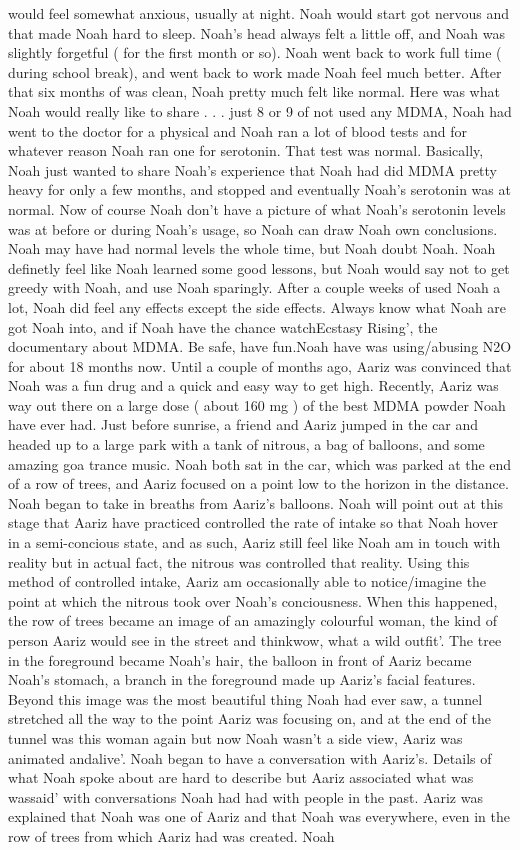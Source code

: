 \documentclass[12pt]{book}
\begin{document}
would feel somewhat anxious, usually at night. Noah would start got nervous and that made Noah hard to sleep. Noah's head always felt a little off, and Noah was slightly forgetful ( for the first month or so). Noah went back to work full time ( during school break), and went back to work made Noah feel much better. After that six months of was clean, Noah pretty much felt like normal. Here was what Noah would really like to share . . .  just 8 or 9 of not used any MDMA, Noah had went to the doctor for a physical and Noah ran a lot of blood tests and for whatever reason Noah ran one for serotonin. That test was normal. Basically, Noah just wanted to share Noah's experience that Noah had did MDMA pretty heavy for only a few months, and stopped and eventually Noah's serotonin was at normal. Now of course Noah don't have a picture of what Noah's serotonin levels was at before or during Noah's usage, so Noah can draw Noah own conclusions. Noah may have had normal levels the whole time, but Noah doubt Noah. Noah definetly feel like Noah learned some good lessons, but Noah would say not to get greedy with Noah, and use Noah sparingly. After a couple weeks of used Noah a lot, Noah did feel any effects except the side effects. Always know what Noah are got Noah into, and if Noah have the chance watchEcstasy Rising', the documentary about MDMA. Be safe, have fun.Noah have was using/abusing N2O for about 18 months now. Until a couple of months ago, Aariz was convinced that Noah was a fun drug and a quick and easy way to get high. Recently, Aariz was way out there on a large dose ( about 160 mg ) of the best MDMA powder Noah have ever had. Just before sunrise, a friend and Aariz jumped in the car and headed up to a large park with a tank of nitrous, a bag of balloons, and some amazing goa trance music. Noah both sat in the car, which was parked at the end of a row of trees, and Aariz focused on a point low to the horizon in the distance. Noah began to take in breaths from Aariz's balloons. Noah will point out at this stage that Aariz have practiced controlled the rate of intake so that Noah hover in a semi-concious state, and as such, Aariz still feel like Noah am in touch with reality but in actual fact, the nitrous was controlled that reality. Using this method of controlled intake, Aariz am occasionally able to notice/imagine the point at which the nitrous took over Noah's conciousness. When this happened, the row of trees became an image of an amazingly colourful woman, the kind of person Aariz would see in the street and thinkwow, what a wild outfit'. The tree in the foreground became Noah's hair, the balloon in front of Aariz became Noah's stomach, a branch in the foreground made up Aariz's facial features. Beyond this image was the most beautiful thing Noah had ever saw, a tunnel stretched all the way to the point Aariz was focusing on, and at the end of the tunnel was this woman again but now Noah wasn't a side view, Aariz was animated andalive'. Noah began to have a conversation with Aariz's. Details of what Noah spoke about are hard to describe but Aariz associated what was wassaid' with conversations Noah had had with people in the past. Aariz was explained that Noah was one of Aariz and that Noah was everywhere, even in the row of trees from which Aariz had was created. Noah 
\end{document}
